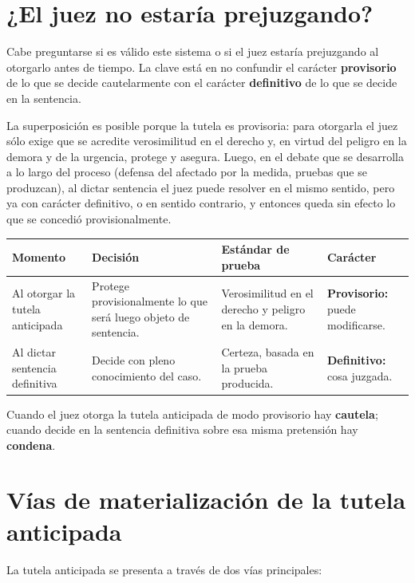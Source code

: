 \documentclass[12pt,oneside]{book}
\renewcommand{\arraystretch}{1.15}
\begin{document}
\section{¿El juez no estaría prejuzgando?}

Cabe preguntarse si es válido este sistema o si el juez estaría prejuzgando al otorgarlo antes de tiempo. La clave está en no confundir el carácter \textbf{provisorio} de lo que se decide cautelarmente con el carácter \textbf{definitivo} de lo que se decide en la sentencia.

La superposición es posible porque la tutela es provisoria: para otorgarla el juez sólo exige que se acredite verosimilitud en el derecho y, en virtud del peligro en la demora y de la urgencia, protege y asegura. Luego, en el debate que se desarrolla a lo largo del proceso (defensa del afectado por la medida, pruebas que se produzcan), al dictar sentencia el juez puede resolver en el mismo sentido, pero ya con carácter definitivo, o en sentido contrario, y entonces queda sin efecto lo que se concedió provisionalmente.

\medskip
\renewcommand{\arraystretch}{1.3}
\noindent\begin{tabularx}{\textwidth}{@{}>{\raggedright\arraybackslash}p{2.6cm} Y Y Y@{}}
\toprule
\textbf{Momento} & \textbf{Decisión} & \textbf{Estándar de prueba} & \textbf{Carácter} \\
\midrule
Al otorgar la tutela anticipada &
Protege provisionalmente lo que será luego objeto de sentencia. &
Verosimilitud en el derecho y peligro en la demora. &
\textbf{Provisorio:} puede modificarse. \\
\addlinespace
Al dictar sentencia definitiva &
Decide con pleno conocimiento del caso. &
Certeza, basada en la prueba producida. &
\textbf{Definitivo:} cosa juzgada. \\
\bottomrule
\end{tabularx}
\renewcommand{\arraystretch}{1}

\medskip
Cuando el juez otorga la tutela anticipada de modo provisorio hay \textbf{cautela}; cuando decide en la sentencia definitiva sobre esa misma pretensión hay \textbf{condena}.

\section{Vías de materialización de la tutela anticipada}

La tutela anticipada se presenta a través de dos vías principales:
\end{document}
